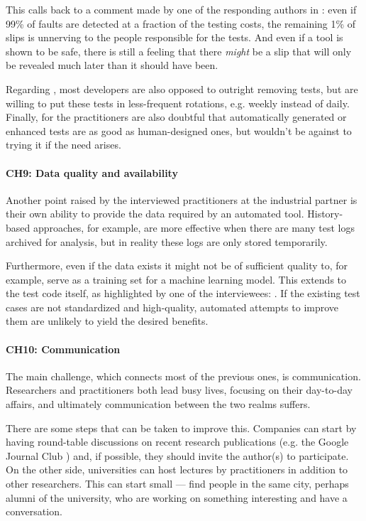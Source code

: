 This calls back to a comment made by one of the responding authors in : even if 99\% of faults are detected at a fraction of the testing costs, the remaining 1\% of slips is unnerving to the people responsible for the tests.
And even if a tool is shown to be safe, there is still a feeling that there \textit{might} be a slip that will only be revealed much later than it should have been.

Regarding \tsr, most developers are also opposed to outright removing tests, but are willing to put these tests in less-frequent rotations, e.g. weekly instead of daily.
Finally, for \tsa the practitioners are also doubtful that automatically generated or enhanced tests are as good as human-designed ones, but wouldn't be against to trying it if the need arises.

\paragraph{CH9: Data quality and availability}
Another point raised by the interviewed practitioners at the industrial partner is their own ability to provide the data required by an automated tool.
History-based approaches, for example, are more effective when there are many test logs archived for analysis, but in reality these logs are only stored temporarily.

Furthermore, even if the data exists it might not be of sufficient quality to, for example, serve as a training set for a machine learning model.
This extends to the test code itself, as highlighted by one of the interviewees:
.
If the existing test cases are not standardized and high-quality, automated attempts to improve them are unlikely to yield the desired benefits.

\paragraph{CH10: Communication}
The main challenge, which connects most of the previous ones, is communication.
Researchers and practitioners both lead busy lives, focusing on their day-to-day affairs, and ultimately communication between the two realms suffers.

There are some steps that can be taken to improve this.
Companies can start by having round-table discussions on recent research publications (e.g. the Google Journal Club \cite{googlejournal}) and, if possible, they should invite the author(s) to participate.
On the other side, universities can host lectures by practitioners in addition to other researchers.
This can start small — find people in the same city, perhaps alumni of the university, who are working on something interesting and have a conversation.

